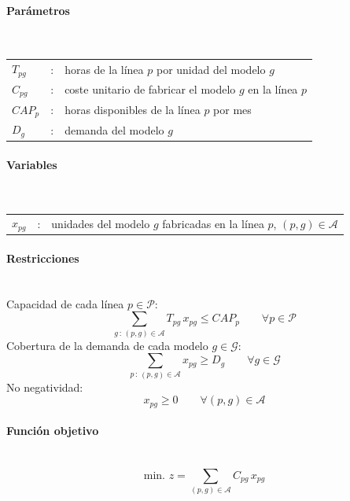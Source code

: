 \paragraph{Parámetros}\mbox{}\\
\begin{tabular}{l c l}
    $T_{pg}$  & : & horas de la línea $p$ por unidad del modelo $g$ \\
    $C_{pg}$  & : & coste unitario de fabricar el modelo $g$ en la línea $p$ \\
    $CAP_p$   & : & horas disponibles de la línea $p$ por mes \\
    $D_g$     & : & demanda del modelo $g$ \\
\end{tabular}

\paragraph{Variables}\mbox{}\\
\begin{tabular}{l c l}
    $x_{pg}$  & : & unidades del modelo $g$ fabricadas en la línea $p$, \quad $(p,g)\in\mathcal{A}$\\
\end{tabular}

\paragraph{Restricciones}\mbox{}\\
Capacidad de cada línea $p \in \mathcal{P}$:
\begin{equation}
    \sum_{g\,:\,(p,g)\in\mathcal{A}} T_{pg}\, x_{pg} \leq CAP_p \qquad \forall p \in \mathcal{P}
\end{equation}
Cobertura de la demanda de cada modelo $g \in \mathcal{G}$:
\begin{equation}
    \sum_{p\,:\,(p,g)\in\mathcal{A}} x_{pg} \geq D_g \qquad \forall g \in \mathcal{G}
\end{equation}
No negatividad:
\begin{equation}
    x_{pg} \geq 0 \qquad \forall (p,g)\in\mathcal{A}
\end{equation}

\paragraph{Función objetivo}\mbox{}\\
\begin{equation}
\mbox{min. } z = \sum_{(p,g)\in\mathcal{A}} C_{pg}\, x_{pg}
\end{equation}

